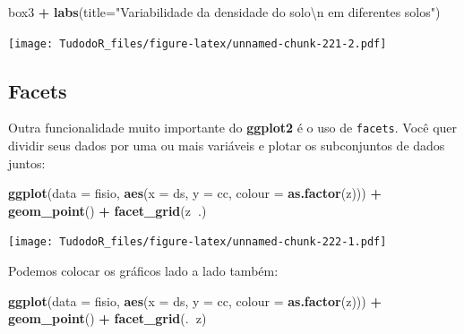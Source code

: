 \documentclass[
]{book}
\newenvironment{Shaded}{\begin{snugshade}}{\end{snugshade}}
\newcommand{\CharTok}[1]{\textcolor[rgb]{0.31,0.60,0.02}{#1}}
\newcommand{\DataTypeTok}[1]{\textcolor[rgb]{0.13,0.29,0.53}{#1}}
\newcommand{\KeywordTok}[1]{\textcolor[rgb]{0.13,0.29,0.53}{\textbf{#1}}}
\newcommand{\NormalTok}[1]{#1}
\newcommand{\OperatorTok}[1]{\textcolor[rgb]{0.81,0.36,0.00}{\textbf{#1}}}
\newcommand{\StringTok}[1]{\textcolor[rgb]{0.31,0.60,0.02}{#1}}
\begin{document}
\begin{Shaded}
\begin{Highlighting}[]
\NormalTok{box3 }\OperatorTok{+}\StringTok{ }\KeywordTok{labs}\NormalTok{(}\DataTypeTok{title=}\StringTok{"Variabilidade da densidade do solo}\CharTok{\textbackslash{}n}\StringTok{ em diferentes solos"}\NormalTok{)}
\end{Highlighting}
\end{Shaded}

\texttt{[image: TudodoR\_files/figure-latex/unnamed-chunk-221-2.pdf]}

\hypertarget{facets}{%
\subsection{Facets}\label{facets}}

Outra funcionalidade muito importante do \textbf{ggplot2} é o uso de \texttt{facets}.
Você quer dividir seus dados por uma ou mais variáveis e plotar os subconjuntos de dados juntos:

\begin{Shaded}
\begin{Highlighting}[]
\KeywordTok{ggplot}\NormalTok{(}\DataTypeTok{data =}\NormalTok{ fisio, }\KeywordTok{aes}\NormalTok{(}\DataTypeTok{x =}\NormalTok{ ds, }\DataTypeTok{y =}\NormalTok{ cc, }\DataTypeTok{colour =} \KeywordTok{as.factor}\NormalTok{(z))) }\OperatorTok{+}
\StringTok{  }\KeywordTok{geom_point}\NormalTok{() }\OperatorTok{+}
\StringTok{  }\KeywordTok{facet_grid}\NormalTok{(z}\OperatorTok{~}\NormalTok{.)}
\end{Highlighting}
\end{Shaded}

\texttt{[image: TudodoR\_files/figure-latex/unnamed-chunk-222-1.pdf]}

Podemos colocar os gráficos lado a lado também:

\begin{Shaded}
\begin{Highlighting}[]
\KeywordTok{ggplot}\NormalTok{(}\DataTypeTok{data =}\NormalTok{ fisio, }\KeywordTok{aes}\NormalTok{(}\DataTypeTok{x =}\NormalTok{ ds, }\DataTypeTok{y =}\NormalTok{ cc, }\DataTypeTok{colour =} \KeywordTok{as.factor}\NormalTok{(z))) }\OperatorTok{+}
\StringTok{  }\KeywordTok{geom_point}\NormalTok{() }\OperatorTok{+}
\StringTok{  }\KeywordTok{facet_grid}\NormalTok{(.}\OperatorTok{~}\NormalTok{z)}
\end{Highlighting}
\end{Shaded}
\end{document}
